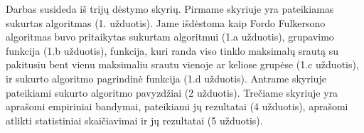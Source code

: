 Darbas susideda iš trijų dėstymo skyrių. Pirmame skyriuje yra pateikiamas sukurtas algoritmas (1. užduotis). Jame išdėstoma kaip Fordo Fulkersono algoritmas buvo pritaikytas sukurtam algoritmui (1.a užduotis), grupavimo funkcija (1.b užduotis), funkcija, kuri randa viso tinklo maksimalų srautą su pakitusiu bent vienu maksimaliu srautu vienoje ar keliose grupėse (1.c užduotis), ir sukurto algoritmo pagrindinė funkcija (1.d užduotis). Antrame skyriuje pateikiami sukurto algoritmo pavyzdžiai (2 užduotis). Trečiame skyriuje yra aprašomi empiriniai bandymai, pateikiami jų rezultatai (4 užduotis), aprašomi atlikti statistiniai skaičiavimai ir jų rezultatai (5 užduotis).